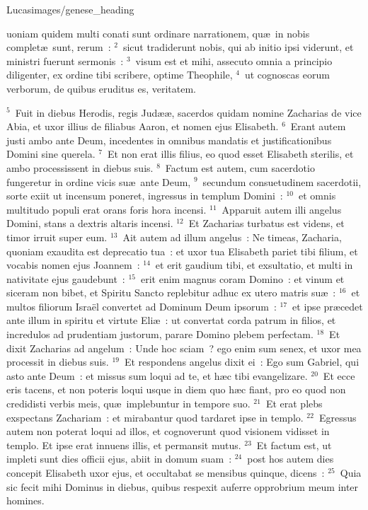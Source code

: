 {Lucas}{images/genese_heading}


\bchapter
{}uoniam quidem multi conati sunt ordinare narrationem, qu\ae\ in nobis complet\ae\ sunt, rerum~:
${}^{2}$~sicut tradiderunt nobis, qui ab initio ipsi viderunt, et ministri fuerunt sermonis~:
${}^{3}$~visum est et mihi, assecuto omnia a principio diligenter, ex ordine tibi scribere, optime Theophile,
${}^{4}$~ut cognoscas eorum verborum, de quibus eruditus es, veritatem.


${}^{5}$~Fuit in diebus Herodis, regis Jud\ae \ae , sacerdos quidam nomine Zacharias de vice Abia, et uxor illius de filiabus Aaron, et nomen ejus Elisabeth.
${}^{6}$~Erant autem justi ambo ante Deum, incedentes in omnibus mandatis et justificationibus Domini sine querela.
${}^{7}$~Et non erat illis filius, eo quod esset Elisabeth sterilis, et ambo processissent in diebus suis.
${}^{8}$~Factum est autem, cum sacerdotio fungeretur in ordine vicis su\ae\ ante Deum,
${}^{9}$~secundum consuetudinem sacerdotii, sorte exiit ut incensum poneret, ingressus in templum Domini~:
${}^{10}$~et omnis multitudo populi erat orans foris hora incensi.
${}^{11}$~Apparuit autem illi angelus Domini, stans a dextris altaris incensi.
${}^{12}$~Et Zacharias turbatus est videns, et timor irruit super eum.
${}^{13}$~Ait autem ad illum angelus~: Ne timeas, Zacharia, quoniam exaudita est deprecatio tua~: et uxor tua Elisabeth pariet tibi filium, et vocabis nomen ejus Joannem~:
${}^{14}$~et erit gaudium tibi, et exsultatio, et multi in nativitate ejus gaudebunt~:
${}^{15}$~erit enim magnus coram Domino~: et vinum et siceram non bibet, et Spiritu Sancto replebitur adhuc ex utero matris su\ae~:
${}^{16}$~et multos filiorum Isra\"el convertet ad Dominum Deum ipsorum~:
${}^{17}$~et ipse pr\ae cedet ante illum in spiritu et virtute Eli\ae~: ut convertat corda patrum in filios, et incredulos ad prudentiam justorum, parare Domino plebem perfectam.
${}^{18}$~Et dixit Zacharias ad angelum~: Unde hoc sciam~? ego enim sum senex, et uxor mea processit in diebus suis.
${}^{19}$~Et respondens angelus dixit ei~: Ego sum Gabriel, qui asto ante Deum~: et missus sum loqui ad te, et h\ae c tibi evangelizare.
${}^{20}$~Et ecce eris tacens, et non poteris loqui usque in diem quo h\ae c fiant, pro eo quod non credidisti verbis meis, qu\ae\ implebuntur in tempore suo.
${}^{21}$~Et erat plebs exspectans Zachariam~: et mirabantur quod tardaret ipse in templo.
${}^{22}$~Egressus autem non poterat loqui ad illos, et cognoverunt quod visionem vidisset in templo. Et ipse erat innuens illis, et permansit mutus.
${}^{23}$~Et factum est, ut impleti sunt dies officii ejus, abiit in domum suam~:
${}^{24}$~post hos autem dies concepit Elisabeth uxor ejus, et occultabat se mensibus quinque, dicens~:
${}^{25}$~Quia sic fecit mihi Dominus in diebus, quibus respexit auferre opprobrium meum inter homines.


